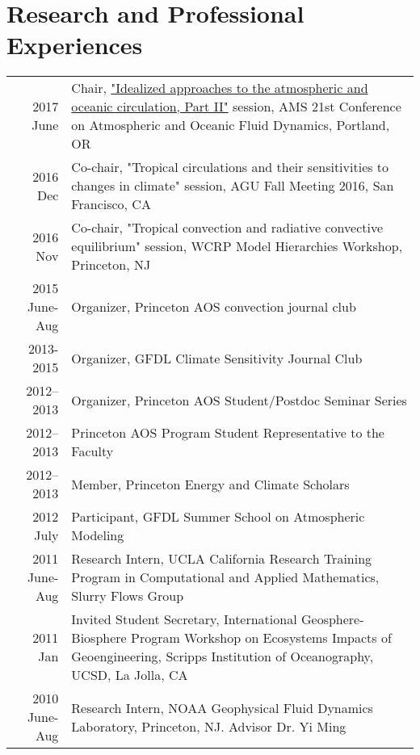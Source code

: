 \documentclass[12pt,letterpaper]{shillcv}
\begin{document}
\section*{Research and Professional Experiences}
\label{sec:org02582d6}
\begin{center}
\begin{tabularx}{\textwidth}{rX}
2017 June & Chair, \href{https://ams.confex.com/ams/21Fluid19Middle/webprogram/Session43327.html}{"Idealized approaches to the atmospheric and oceanic circulation, Part II"} session, AMS 21st Conference on Atmospheric and Oceanic Fluid Dynamics, Portland, OR\\
2016 Dec & Co-chair, "Tropical circulations and their sensitivities to changes in climate" session, AGU Fall Meeting 2016, San Francisco, CA\\
2016 Nov & Co-chair, "Tropical convection and radiative convective equilibrium" session, WCRP Model Hierarchies Workshop, Princeton, NJ\\
2015 June-Aug & Organizer, Princeton AOS convection journal club\\
2013-2015 & Organizer, GFDL Climate Sensitivity Journal Club\\
2012–2013 & Organizer, Princeton AOS Student/Postdoc Seminar Series\\
2012–2013 & Princeton AOS Program Student Representative to the Faculty\\
2012–2013 & Member, Princeton Energy and Climate Scholars\\
2012 July & Participant, GFDL Summer School on Atmospheric Modeling\\
2011 June-Aug & Research Intern, UCLA California Research Training Program in Computational and Applied Mathematics, Slurry Flows Group\\
2011 Jan & Invited Student Secretary, International Geosphere-Biosphere Program Workshop on Ecosystems Impacts of Geoengineering, Scripps Institution of Oceanography, UCSD, La Jolla, CA\\
2010 June-Aug & Research Intern, NOAA Geophysical Fluid Dynamics Laboratory, Princeton, NJ. Advisor Dr. Yi Ming\\
\end{tabularx}
\end{center}
\end{document}
